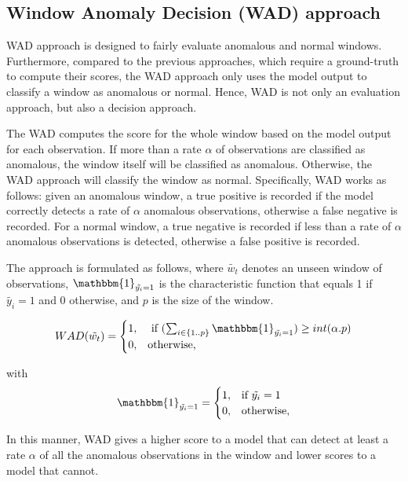 \subsection{Window Anomaly Decision (WAD) approach}

WAD approach is designed to fairly evaluate anomalous and normal windows. Furthermore, compared to the previous approaches, which require a ground-truth to compute their scores, the WAD approach only uses the model output to classify a window as anomalous or normal. Hence, WAD is not only an evaluation approach, but also a decision approach.

The WAD computes the score for the whole window based on the model output for each observation. If more than a rate $\alpha$ of observations are classified as anomalous, the window itself will be classified as anomalous. Otherwise, the WAD approach will classify the window as normal. Specifically, WAD works as follows: given an anomalous window, a true positive is recorded if the model correctly detects a rate of $\alpha$ anomalous observations, otherwise a false negative is recorded. For a normal window, a true negative is recorded if less than a rate of $\alpha$ anomalous observations is detected, otherwise a false positive is recorded. 

The approach is formulated as follows, where $\tilde{w_t}$ denotes an unseen window of observations, $\mathbbm{1}_{\tilde{y_i}=1}$ is the characteristic function that equals 1 if $\tilde{y_i}=1$ and 0 otherwise, and $p$ is the size of the window.

\begin{equation}
    WAD(\tilde{w_t}) = 
     \begin{cases}
     1, & \text{ if } (\sum_{i \in \{1..p\}} \mathbbm{1}_{\tilde{y_i}=1}) \geq int(\alpha.p) \\
     0, & \text{otherwise,}
     \end{cases}
\end{equation}

with
\begin{equation}
    \mathbbm{1}_{\tilde{y_i}=1} = 
    \begin{cases}
    1,& \text{if } \tilde{y_i}=1 \\
    0,& \text{otherwise,}
    \end{cases}
\end{equation}

\noindent
In this manner, WAD gives a higher score to a model that can detect at least a rate $\alpha$ of all the anomalous observations in the window and lower scores to a model that cannot.



